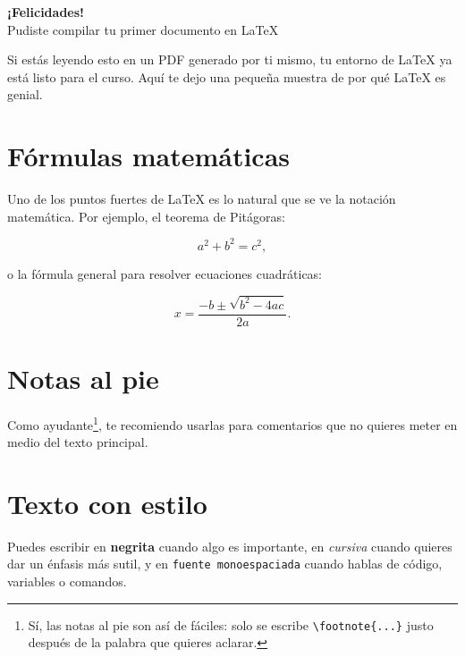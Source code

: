 \documentclass[12pt]{article}
\begin{document}
\begin{center}
    {\LARGE \textbf{¡Felicidades!}} \\[0.2cm]
    {\large Pudiste compilar tu primer documento en \LaTeX{}}
\end{center}
\vspace{0.3cm}

Si estás leyendo esto en un PDF generado por ti mismo, tu entorno de \LaTeX{} ya está listo para el curso. Aquí te dejo una pequeña muestra de por qué \LaTeX{} es genial.

\tableofcontents
\vspace{0.5cm}

\section{Fórmulas matemáticas}

Uno de los puntos fuertes de \LaTeX{} es lo natural que se ve la notación matemática. Por ejemplo, el teorema de Pitágoras:

\[
    a^2 + b^2 = c^2,
\]

o la fórmula general para resolver ecuaciones cuadráticas:

\[
    x = \frac{-b \pm \sqrt{b^2 - 4ac}}{2a}.
\]

\section{Notas al pie}

Como ayudante\footnote{Sí, las notas al pie son así de fáciles: solo se escribe \texttt{\textbackslash footnote\{...\}} justo después de la palabra que quieres aclarar.}, te recomiendo usarlas para comentarios que no quieres meter en medio del texto principal.

\section{Texto con estilo}

Puedes escribir en \textbf{negrita} cuando algo es importante, en \textit{cursiva} cuando quieres dar un énfasis más sutil, y en \texttt{fuente monoespaciada} cuando hablas de código, variables o comandos.
\end{document}
